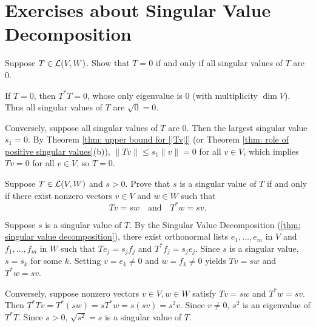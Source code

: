 \section*{Exercises about Singular Value Decomposition}

\begin{xrcs}
  Suppose $T \in \mathcal{L}(V,W)$. Show that $T = 0$ if and only if all singular values of $T$ are $0$.

\begin{xprf}
  \Rightarrowdirection If $T = 0$, then $T^*T = 0$, whose only eigenvalue is $0$ (with multiplicity $\dim V$). Thus all singular values of $T$ are $\sqrt{0} = 0$.

  \Leftarrowdirection Conversely, suppose all singular values of $T$ are $0$.
  Then the largest singular value $s_1 = 0$.
  By Theorem \ref{thm: upper bound for ||Tv||} (or Theorem \ref{thm: role of positive singular values}(b)), $\|Tv\| \le s_1 \|v\| = 0$ for all $v \in V$, which implies $Tv = 0$ for all $v \in V$, so $T = 0$.
\end{xprf}
\end{xrcs}

\begin{xrcs}
  Suppose $T \in \mathcal{L}(V,W)$ and $s > 0$. Prove that $s$ is a singular value of $T$ if and only if there exist nonzero vectors $v \in V$ and $w \in W$ such that
  \begin{equation}
    Tv = sw \quad \text{and} \quad T^*w = sv.
  \end{equation}

\begin{xprf}
  \Rightarrowdirection Suppose $s$ is a singular value of $T$. By the Singular Value Decomposition (\ref{thm: singular value decomposition}), there exist orthonormal lists $e_1, \dots, e_m$ in $V$ and $f_1, \dots, f_m$ in $W$ such that $T e_j = s_j f_j$ and $T^* f_j = s_j e_j$.
  Since $s$ is a singular value, $s = s_k$ for some $k$. Setting $v = e_k \neq 0$ and $w = f_k \neq 0$ yields $Tv = sw$ and $T^*w = sv$.

  \Leftarrowdirection Conversely, suppose nonzero vectors $v \in V, w \in W$ satisfy $Tv = sw$ and $T^*w = sv$.
  Then $T^*Tv = T^*(sw) = s T^*w = s(sv) = s^2 v$.
  Since $v \neq 0$, $s^2$ is an eigenvalue of $T^*T$.
  Since $s > 0$, $\sqrt{s^2} = s$ is a singular value of $T$.
\end{xprf}
\end{xrcs}

